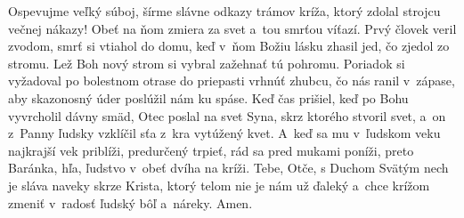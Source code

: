 Ospevujme veľký súboj,
šírme slávne odkazy
trámov kríža, ktorý zdolal
strojcu večnej nákazy!
Obeť na ňom zmiera za svet
a~tou smrťou víťazí.
\versseparator
Prvý človek veril zvodom,
smrť si vtiahol do domu,
keď v~ňom Božiu lásku zhasil
jed, čo zjedol zo stromu.
Lež Boh nový strom si vybral
zažehnať tú pohromu.
\versseparator
Poriadok si vyžadoval
po bolestnom otrase
do priepasti vrhnúť zhubcu,
čo nás ranil v~zápase,
aby skazonosný úder
poslúžil nám ku spáse.
\versseparator
Keď čas prišiel, keď po Bohu
vyvrcholil dávny smäd,
Otec poslal na svet Syna,
skrz ktorého stvoril svet,
a~on z~Panny ľudsky vzklíčil
sťa z~kra vytúžený kvet.
\versseparator
A~keď sa mu v~ľudskom veku
najkrajší vek priblíži,
predurčený trpieť, rád sa
pred mukami poníži,
preto Baránka, hľa, ľudstvo
v~obeť dvíha na kríži.
\versseparator
Tebe, Otče, s Duchom Svätým
nech je sláva naveky
skrze Krista, ktorý telom
nie je nám už ďaleký
a~chce krížom zmeniť v~radosť
ľudský bôľ a~náreky. Amen.

